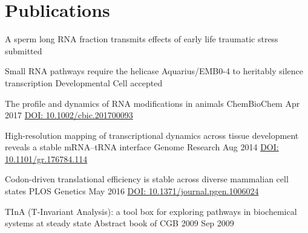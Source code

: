 \documentclass{klmr-cv}
\begin{document}
\section{Publications}


\begin{bibliography}
    {A sperm long RNA fraction transmits effects of early life traumatic stress}
    {}
    {submitted}
    {}

    {Small RNA pathways require the helicase Aquarius/EMB0-4 to heritably
        silence transcription}
    {Developmental Cell}
    {accepted}
    {}

    {The profile and dynamics of RNA modifications in animals}
    {ChemBioChem}
    {Apr 2017}
    {\href{http://dx.doi.org/10.1002/cbic.201700093}{DOI:
        10.1002/cbic.201700093}}

    {High-resolution mapping of transcriptional dynamics across tissue
        development reveals a stable mRNA--tRNA interface}
    {Genome Research}
    {Aug 2014}
    {\href{http://dx.doi.org/10.1101/gr.176784.114}{DOI: 10.1101/gr.176784.114}}

    {Codon-driven translational efficiency is stable across diverse mammalian
        cell states}
    {PLOS Genetics}
    {May 2016}
    {\href{http://dx.doi.org/10.1371/journal.pgen.1006024}{DOI:
        10.1371/journal.pgen.1006024}}

    {TInA (T-Invariant Analysis): a tool box for exploring pathways in
        biochemical systems at steady state}
    {Abstract book of CGB 2009}
    {Sep 2009}
    {}
\end{bibliography}
\end{document}
